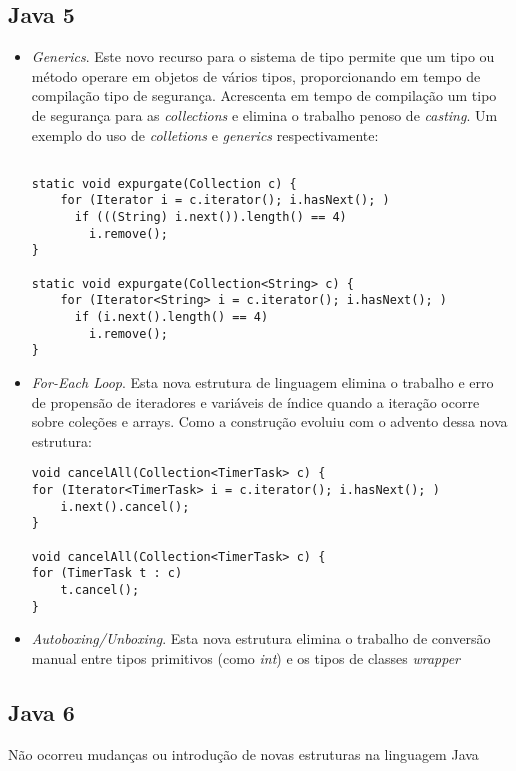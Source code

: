 \subsection {Java 5}
  \begin{itemize}
  \item {\it Generics}. Este novo recurso para o sistema de tipo permite que um tipo ou método operare em objetos de vários tipos, proporcionando em tempo de compilação tipo de segurança. Acrescenta em tempo de compilação um tipo de segurança para as {\it collections} e elimina o trabalho penoso de {\it casting}. Um exemplo do uso de {\it colletions} e {\it generics} respectivamente:
  \begin{lstlisting}

static void expurgate(Collection c) {
    for (Iterator i = c.iterator(); i.hasNext(); )
      if (((String) i.next()).length() == 4)
        i.remove();
}

static void expurgate(Collection<String> c) {
    for (Iterator<String> i = c.iterator(); i.hasNext(); )
      if (i.next().length() == 4)
        i.remove();
}
  \end{lstlisting}
  \item {\it For-Each Loop}. Esta nova estrutura de linguagem elimina o trabalho e erro de propensão de iteradores e variáveis de índice quando a iteração ocorre sobre coleções e arrays. Como a construção evoluiu com o advento dessa nova estrutura:
  
\begin{lstlisting}
void cancelAll(Collection<TimerTask> c) {
for (Iterator<TimerTask> i = c.iterator(); i.hasNext(); )
    i.next().cancel();
}

void cancelAll(Collection<TimerTask> c) {
for (TimerTask t : c)
    t.cancel();
}
\end{lstlisting}

  \item {\it Autoboxing/Unboxing}. Esta nova estrutura elimina o trabalho de conversão manual entre tipos primitivos (como {\it int}) e os tipos de classes {\it wrapper}
  \end{itemize}
  
\subsection {Java 6}
Não ocorreu mudanças ou introdução de novas estruturas na linguagem Java\\


